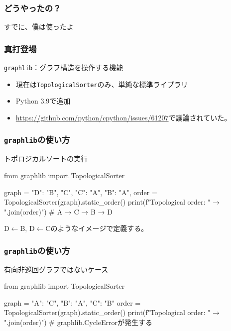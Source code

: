 \documentclass[aspectratio=169,dvipdfmx,12pt,notheorems]{beamer}
\theoremstyle{definition}
\begin{document}
\begin{frame}\frametitle{どうやったの？}

\begin{center}
\Huge{すでに、僕は使ったよ}
\end{center}

\end{frame}

\begin{frame}\frametitle{真打登場}

\begin{block}{\texttt{graphlib}：グラフ構造を操作する機能}
\begin{itemize}
\item 現在は\texttt{TopologicalSorter}のみ、単純な標準ライブラリ
\item Python 3.9で追加
\item \url{https://github.com/python/cpython/issues/61207}で議論されていた。
\end{itemize}
\end{block}

\end{frame}

\begin{frame}[fragile]\frametitle{\texttt{graphlib}の使い方}
\begin{exampleblock}{トポロジカルソートの実行}
\begin{pyverbatim}
from graphlib import TopologicalSorter

graph = {
    "D": {"B", "C"}, 
    "C": {"A"},
    "B": {"A"},
}
order = TopologicalSorter(graph).static_order()
print(f"Topological order: {" → ".join(order)}")
# A → C → B → D
\end{pyverbatim}
\end{exampleblock}
D$\leftarrow$B, D$\leftarrow$Cのようなイメージで定義する。
\end{frame}

\begin{frame}[fragile]\frametitle{\texttt{graphlib}の使い方}
\begin{alertblock}{有向非巡回グラフではないケース}
\begin{pyverbatim}
from graphlib import TopologicalSorter

graph = {
    "A": {"C"},
    "B": {"A"},
    "C": {"B"}
}
order = TopologicalSorter(graph).static_order()
print(f"Topological order: {" → ".join(order)}")
# graphlib.CycleErrorが発生する
\end{pyverbatim}
\end{alertblock}
\end{frame}
\end{document}
